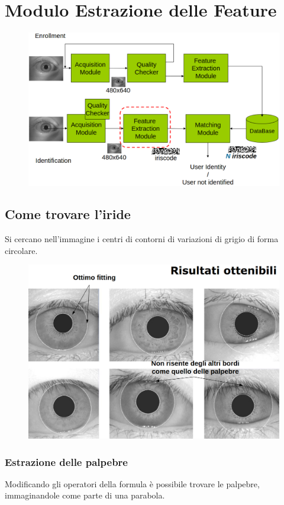 \documentclass{report}
\begin{document}
\newpage
\section{Modulo Estrazione delle Feature}

\begin{figure}[ht]
    \centering
    \includegraphics[width=1\linewidth]{images/estrazione-features.png}
\end{figure}

\subsection{Come trovare l'iride}
Si cercano nell'immagine i centri di contorni di variazioni di grigio di forma circolare.

\begin{figure}[ht]
    \centering
    \includegraphics[width=0.6\linewidth]{images/ricerca-iride.png}
\end{figure}

\subsubsection{Estrazione delle palpebre}
\noindent Modificando gli operatori della formula è possibile trovare le palpebre, 
immaginandole come parte di una parabola.
\end{document}

